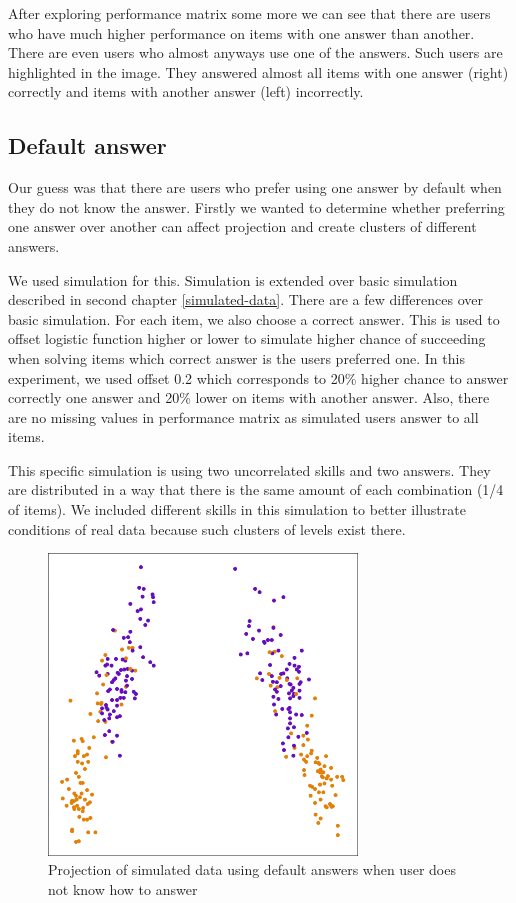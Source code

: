 \documentclass[
  digital, %
  table,   %
  nolof,     %
  nolot,     %
  nocover,
  color,
  final, %
]{fithesis3}
\begin{document}
After exploring performance matrix some more we can see that there are users who have much higher performance on items with one answer than another. There are even users who almost anyways use one of the answers. Such users are highlighted in the image. They answered almost all items with one answer (right) correctly and items with another answer (left) incorrectly.


\subsection{Default answer}\label{default-answer}

Our guess was that there are users who prefer using one answer by default when they do not know the answer. Firstly we wanted to determine whether preferring one answer over another can affect projection and create clusters of different answers.

We used simulation for this. Simulation is extended over basic simulation described in second chapter \ref{simulated-data}. There are a few differences over basic simulation. For each item, we also choose a correct answer. This is used to offset logistic function higher or lower to simulate higher chance of succeeding when solving items which correct answer is the users preferred one. In this experiment, we used offset 0.2 which corresponds to 20\% higher chance to answer correctly one answer and 20\% lower on items with another answer. Also, there are no missing values in performance matrix as simulated users answer to all items.

This specific simulation is using two uncorrelated skills and two answers. They are distributed in a way that there is the same amount of each combination (1/4 of items). We included different skills in this simulation to better illustrate conditions of real data because such clusters of levels exist there.

\begin{figure}
  \includegraphics[height=8cm]{img/simulated_default}
  \caption{Projection of simulated data using default answers when user does not know how to answer}
  \label{fig:simulated_default}
\end{figure}
\end{document}
